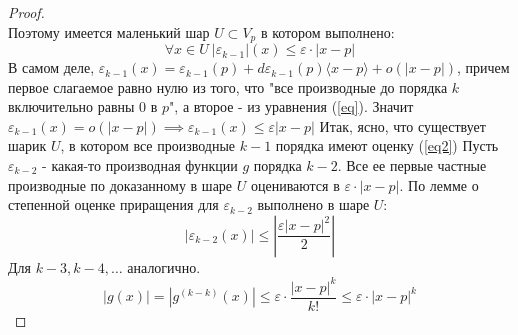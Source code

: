 \begin{theorem*}
\begin{proof}
\begin{equation}
        \end{equation}
        Поэтому имеется маленький шар $U \subset V_p$ в котором выполнено:
        \begin{equation}
            \label{eq2}
            \forall x \in U \ \left| \varepsilon_{k-1}\right|(x) \leq \varepsilon\cdot \left| x - p \right|
        \end{equation}
        В самом деле, $\varepsilon_{k-1}(x) = \varepsilon_{k-1}(p) + d\varepsilon_{k-1}(p)\langle x - p \rangle + o(\left| x - p \right|)$, причем первое слагаемое равно нулю из того, что "все производные до порядка $k$ включительно равны $0$ в $p$", а второе - из уравнения (\ref{eq}).
        Значит $\varepsilon_{k-1}(x) = o(\left| x - p\right|) \implies \varepsilon_{k-1}(x) \leq \varepsilon\left| x - p \right|$
        Итак, ясно, что существует шарик $U$, в котором все производные $k-1$ порядка 
        имеют оценку (\ref{eq2})
        Пусть $\varepsilon_{k-2}$ - какая-то производная функции $g$ порядка $k-2$. Все ее первые частные производные по доказанному в шаре $U$ оцениваются в $\varepsilon\cdot \left| x - p\right|$.
        По лемме о степенной оценке приращения для $\varepsilon_{k-2}$ выполнено в шаре $U$:
        \[\left| \varepsilon_{k-2}(x)\right| \leq \left| \frac{\varepsilon \left| x - p\right|^2}{2}\right|\]
        Для $k-3, k-4, \hdots$ аналогично. 
        \[\left| g(x) \right| = \left| g^{(k-k)}(x) \right| \leq \varepsilon \cdot \frac{\left| x- p \right| ^ k}{k!} \leq \varepsilon\cdot \left| x - p\right|^k
        \]
    \end{proof}
\end{theorem*}

